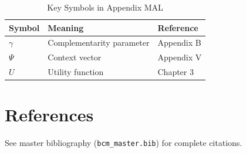 \begin{table}[htbp]
\centering
\caption{Key Symbols in Appendix MAL}
\begin{tabular}{lll}
\toprule
\textbf{Symbol} & \textbf{Meaning} & \textbf{Reference} \\
\midrule
$\gamma$ & Complementarity parameter & Appendix B \\
$\Psi$ & Context vector & Appendix V \\
$U$ & Utility function & Chapter 3 \\
\bottomrule
\end{tabular}
\end{table}


\section{References}
\label{sec:mal-references}

See master bibliography (\texttt{bcm\_master.bib}) for complete citations.

\nocite{bcm_master}

